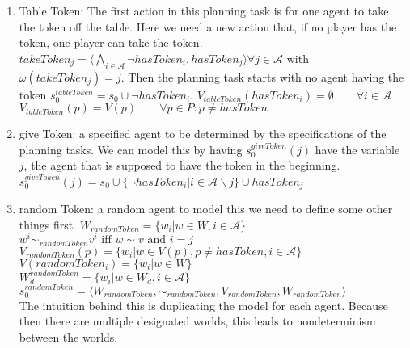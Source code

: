 \begin{enumerate}
  \item Table Token:
    The first action in this planning task is for one agent to take the token off the table. Here we need a new action that, if no player has the token, one player can take the token.\\
    $takeToken_j=\langle \bigwedge\limits_{i \in \mathcal{A}}
    \neg hasToken_i, hasToken_j \rangle \forall j \in \mathcal{A}$ with $\omega(takeToken_j)=j$. Then the planning task starts with no agent having the token
    $s_0^{tableToken} = s_0 \cup \neg hasToken_i$.
    $V_{tableToken}(hasToken_i)=\emptyset \qquad \forall i\in \mathcal{A}$\\
    $V_{tableToken}(p)=V(p) \qquad \forall p\in P : p \not = hasToken$

  \item give Token:
    a specified agent to be determined by the specifications of the planning tasks. We can model this by having $s_0^{giveToken}(j)$ have the variable $j$, the agent that is supposed to have the token in the beginning.
     $s_0^{giveToken}(j) = s_0 \cup \{\neg hasToken_i|i \in \mathcal{A} \backslash j\} \cup hasToken_j$

  \item random Token:
    a random agent
    to model this we need to define some other things first.
    $W_{randomToken}=\{w_i|w \in W, i\in \mathcal{A}\}$ \\
    $w^i \sim_{randomToken} v^i \text{ iff } w \sim v \text{ and } i=j$ \\
    $V_{randomToken}(p)=\{w_i|w\in V(p), p \not = hasToken, i\in \mathcal{A}\}$ \\
    $V(randomToken_i)=\{w_i|w \in W\}$ \\
    $W^{randomToken}_d=\{w_i|w\in W_d, i\in \mathcal{A}\}$ \\
    $s_0^{randomToken}=\langle W_{randomToken}, \sim_{randomToken}, V_{randomToken}, W_{randomToken} \rangle$ \\
    The intuition behind this is duplicating the model for each agent. Because then there are multiple designated worlds, this leads to nondeterminism between the worlds.
\end{enumerate}



